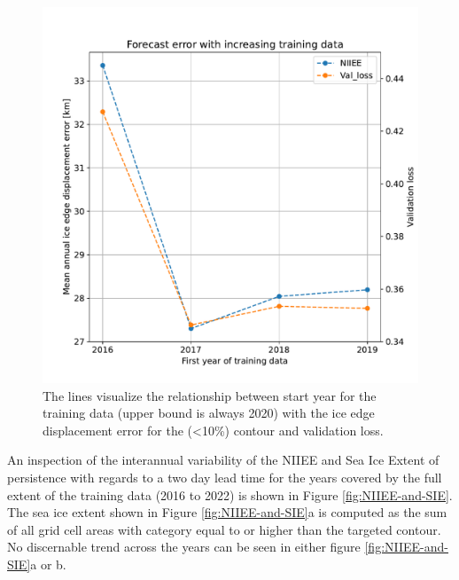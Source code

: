 \documentclass[../main/thesis]{subfiles}
\begin{document}
\begin{figure}
    \centering
    \includegraphics[width=.9\textwidth]{years_start.pdf}
    \caption{\label{fig:append_years}The lines visualize the relationship between start year for the training data (upper bound is always 2020) with the ice edge displacement error for the (<10\%) contour and validation loss.}
\end{figure}

An inspection of the interannual variability of the NIIEE and Sea Ice Extent of persistence with regards to a two day lead time for the years covered by the full extent of the training data (2016 to 2022) is shown in Figure \ref{fig:NIIEE-and-SIE}. The sea ice extent shown in Figure \ref{fig:NIIEE-and-SIE}a is computed as the sum of all grid cell areas with category equal to or higher than the targeted contour. No discernable trend across the years can be seen in either figure \ref{fig:NIIEE-and-SIE}a or b.
\end{document}
